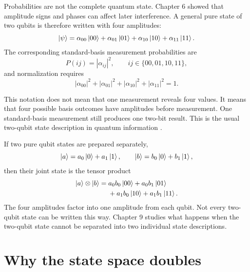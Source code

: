 Probabilities are not the complete quantum state. Chapter 6 showed that amplitude signs and phases can affect later interference. A general pure state of two qubits is therefore written with four amplitudes:
\begin{equation}
\ket{\psi}
=\alpha_{00}\ket{00}
+\alpha_{01}\ket{01}
+\alpha_{10}\ket{10}
+\alpha_{11}\ket{11}.
\label{eq:ch08-general-two-qubit-state}
\end{equation}
The corresponding standard-basis measurement probabilities are
\begin{equation}
P(ij)=|\alpha_{ij}|^2,
\qquad ij\in\{00,01,10,11\},
\label{eq:ch08-two-qubit-born-rule}
\end{equation}
and normalization requires
\begin{equation}
|\alpha_{00}|^2+|\alpha_{01}|^2+|\alpha_{10}|^2+|\alpha_{11}|^2=1.
\end{equation}

This notation does not mean that one measurement reveals four values. It means that four possible basis outcomes have amplitudes before measurement. One standard-basis measurement still produces one two-bit result. This is the usual two-qubit state description in quantum information \citep{nielsenChuang2010,mermin2007quantumComputerScience}.

\begin{goingdeeper}
If two pure qubit states are prepared separately,
\begin{equation}
\ket{a}=a_0\ket{0}+a_1\ket{1},
\qquad
\ket{b}=b_0\ket{0}+b_1\ket{1},
\end{equation}
then their joint state is the tensor product
\begin{align}
\ket{a}\otimes\ket{b}
={}&a_0b_0\ket{00}+a_0b_1\ket{01}\\
&+a_1b_0\ket{10}+a_1b_1\ket{11}.
\label{eq:ch08-product-amplitudes}
\end{align}
The four amplitudes factor into one amplitude from each qubit. Not every two-qubit state can be written this way. Chapter 9 studies what happens when the two-qubit state cannot be separated into two individual state descriptions.
\end{goingdeeper}

\section{Why the state space doubles}
\label{sec:ch08-state-space-growth}

